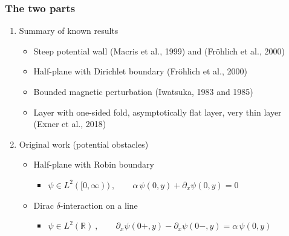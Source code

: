 \documentclass{beamer}
\newcommand{\R}{\ensuremath{\mathbb R}}
\begin{document}
\begin{frame}
    \frametitle{The two parts}

    \begin{enumerate}
        \pause
        \item Summary of known results
        \\[5pt]
        \begin{itemize}
            \item Steep potential wall (Macris et al., 1999) and (Fröhlich et al., 2000)
            \\[5pt]
            \item Half-plane with Dirichlet boundary (Fröhlich et al., 2000)
            \\[5pt]
            \item Bounded magnetic perturbation (Iwatsuka, 1983 and 1985)
            \\[5pt]
            \item Layer with one-sided fold, asymptotically flat layer, very thin layer (Exner et al., 2018)
            \\[15pt]
        \end{itemize}
        \pause
        \item Original work (potential obstacles)
        \\[5pt]
        \begin{itemize}
            \item Half-plane with Robin boundary
            \begin{itemize}
                \item $\psi \in L^2([0,\infty)) \:, \qquad \alpha \, \psi(0, y) + \partial_x \psi(0,y) = 0$
                \\[15pt]
            \end{itemize}
            \item Dirac $\delta$-interaction on a line
            \begin{itemize}
                \item $\psi \in L^2(\R) \:, \qquad \partial_x \psi(0+, y) - \partial_x \psi(0-, y) = \alpha \, \psi(0, y)$
            \end{itemize}
        \end{itemize}
    \end{enumerate}
\end{frame}
\end{document}

